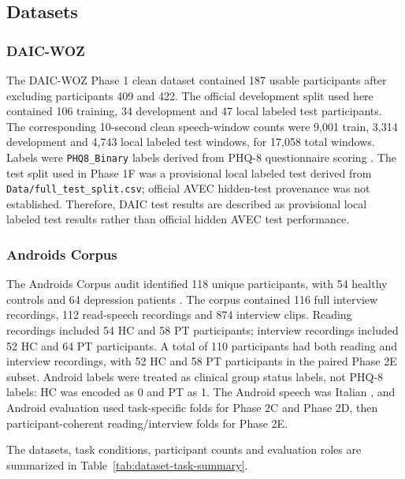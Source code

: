 \documentclass[lettersize,journal]{IEEEtran}
\begin{document}
\subsection{Datasets}

\subsubsection{DAIC-WOZ}

The DAIC-WOZ Phase 1 clean dataset contained 187 usable participants after excluding participants 409 and 422. The official development split used here contained 106 training, 34 development and 47 local labeled test participants. The corresponding 10-second clean speech-window counts were 9,001 train, 3,314 development and 4,743 local labeled test windows, for 17,058 total windows. Labels were \texttt{PHQ8\_Binary} labels derived from PHQ-8 questionnaire scoring \cite{valstar2016avec,kroenke2009phq8}. The test split used in Phase 1F was a provisional local labeled test derived from \texttt{Data/full\_test\_split.csv}; official AVEC hidden-test provenance was not established. Therefore, DAIC test results are described as provisional local labeled test results rather than official hidden AVEC test performance.

\subsubsection{Androids Corpus}

The Androids Corpus audit identified 118 unique participants, with 54 healthy controls and 64 depression patients \cite{tao2023androids}. The corpus contained 116 full interview recordings, 112 read-speech recordings and 874 interview clips. Reading recordings included 54 HC and 58 PT participants; interview recordings included 52 HC and 64 PT participants. A total of 110 participants had both reading and interview recordings, with 52 HC and 58 PT participants in the paired Phase 2E subset. Android labels were treated as clinical group status labels, not PHQ-8 labels: HC was encoded as 0 and PT as 1. The Android speech was Italian \cite{tao2023androids}, and Android evaluation used task-specific folds for Phase 2C and Phase 2D, then participant-coherent reading/interview folds for Phase 2E.

The datasets, task conditions, participant counts and evaluation roles are summarized in Table~\ref{tab:dataset-task-summary}.


\end{document}
